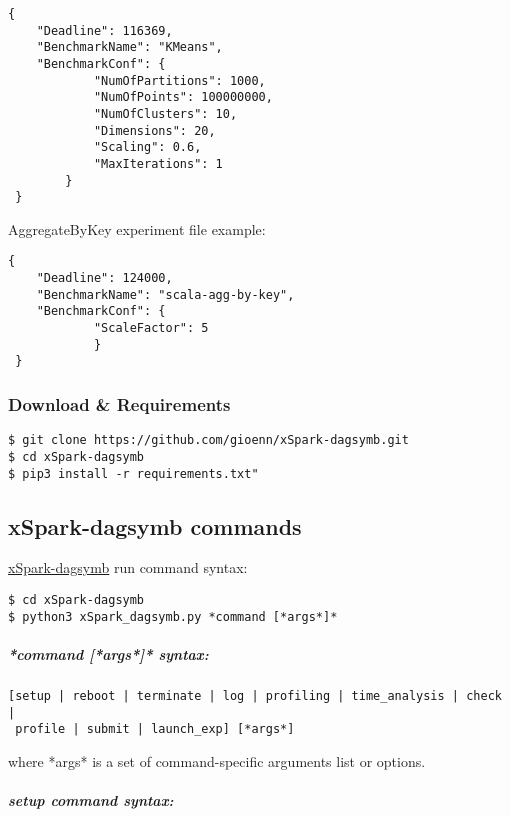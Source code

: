 \documentclass[
]{article}
\let\oldsubparagraph\subparagraph
\renewcommand{\subparagraph}[1]{\oldsubparagraph{#1}\mbox{}}
\begin{document}
\begin{verbatim}
{
    "Deadline": 116369,
    "BenchmarkName": "KMeans",
    "BenchmarkConf": {
            "NumOfPartitions": 1000,
            "NumOfPoints": 100000000,
            "NumOfClusters": 10,
            "Dimensions": 20,
            "Scaling": 0.6,
            "MaxIterations": 1
        }
 }
\end{verbatim}

AggregateByKey experiment file example:

\begin{verbatim}
{
    "Deadline": 124000,
    "BenchmarkName": "scala-agg-by-key",
    "BenchmarkConf": {
            "ScaleFactor": 5
            }
 }
\end{verbatim}

\hypertarget{download-requirements}{%
\subsubsection{Download \& Requirements}\label{download-requirements}}

\begin{verbatim}
$ git clone https://github.com/gioenn/xSpark-dagsymb.git
$ cd xSpark-dagsymb
$ pip3 install -r requirements.txt"
\end{verbatim}

\hypertarget{xspark-dagsymb-commands}{%
\subsection{xSpark-dagsymb commands}\label{xspark-dagsymb-commands}}

\href{https://github.com/gioenn/xSpark-dagsymb}{xSpark-dagsymb} run
command syntax:

\begin{verbatim}
$ cd xSpark-dagsymb
$ python3 xSpark_dagsymb.py *command [*args*]*
\end{verbatim}

\hypertarget{command-args-syntax}{%
\subparagraph{*command {[}*args*{]}*
syntax:}\label{command-args-syntax}}

\begin{verbatim}
[setup | reboot | terminate | log | profiling | time_analysis | check | 
 profile | submit | launch_exp] [*args*]
\end{verbatim}

where *args* is a set of command-specific arguments list or options.

\hypertarget{setup-command-syntax}{%
\subparagraph{\texorpdfstring{\emph{setup} command
syntax:}{setup command syntax:}}\label{setup-command-syntax}}
\end{document}
